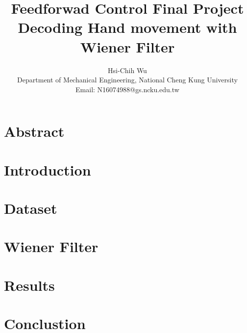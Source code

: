 \documentclass[8pt,a4paper]{article}
\begin{document}
\title{ \bf{ Feedforwad Control Final Project \\  Decoding Hand movement with Wiener Filter }}
\author{ Hsi-Chih Wu \\ Department of Mechanical Engineering, National Cheng Kung University \\ Email: N16074988@gs.ncku.edu.tw  }
\date{}

\maketitle

\begin{multicols}{2}

\section*{Abstract}

\section{Introduction}

\section{Dataset}

\section{Wiener Filter}

\section{Results}

\section{Conclustion}

 \label{sec:references}
\newpage


\end{multicols}
\end{document}
